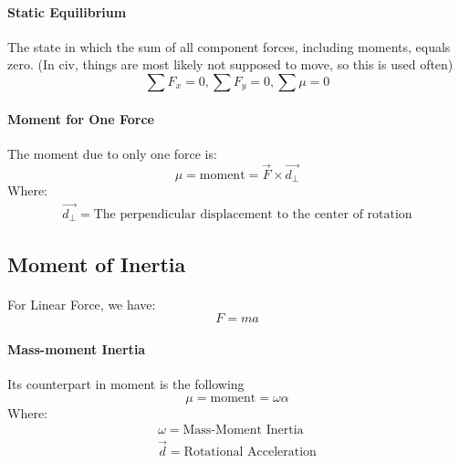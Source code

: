 \paragraph{Static Equilibrium} The state in which the sum of all component forces, including moments, equals zero. (In civ, things are most likely not supposed to move, so this is used often)
\begin{equation}
    \sum F_x=0,\sum F_y=0, \sum \mu = 0
\end{equation}
\begin{shaded}
    \paragraph{Moment for One Force} The moment due to only one force is:
    \begin{equation}
        \mu = \mathrm{moment} = \Vec{F}\times\Vec{d_\perp}
    \end{equation}
Where:
\begin{equation*}
\begin{split}
\Vec{d_\perp} = \text{The perpendicular displacement to the center of rotation}
\end{split}
\end{equation*}
\end{shaded}
\subsection{Moment of Inertia}
\paragraph{} For Linear Force, we have:
$$
F=ma
$$
\begin{shaded}
    \paragraph{Mass-moment Inertia} Its counterpart in moment is the following
    \begin{equation}
        \mu = \mathrm{moment} = \omega\alpha
    \end{equation}
    Where:
    \begin{equation*}
    \begin{split}
    \omega = \text{Mass-Moment Inertia} \\
    \Vec{d} = \text{Rotational Acceleration} \\
    \end{split}
    \end{equation*}
\end{shaded}
